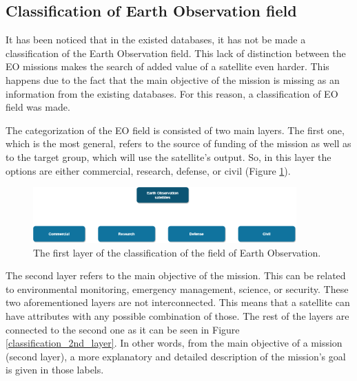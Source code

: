 \bigskip
\subsection{Classification of Earth Observation field}
\bigskip

It has been noticed that in the existed databases, it has not be made a classification of the Earth Observation field. This lack of distinction between the EO missions makes the search of added value of a satellite even harder. This happens due to the fact that the main objective of the mission is missing as an information from the existing databases. For this reason, a classification of EO field was made.

The categorization of the EO field is consisted of two main layers. The first one, which is the most general, refers to the source of funding of the mission as well as to the target group, which will use the satellite's output. So, in this layer the options are either commercial, research, defense, or civil (Figure \ref{classification_1st_layer}).

\begin{figure}
\centering
\includegraphics[width=0.9\textwidth]{Images/classification_1st_layer.png}\caption{The first layer of the classification of the field of Earth Observation.}
\label{classification_1st_layer}
\end{figure}

The second layer refers to the main objective of the mission. This can be related to environmental monitoring, emergency management, science, or security. These two aforementioned layers are not interconnected. This means that a satellite can have attributes with any possible combination of those. The rest of the layers are connected to the second one as it can be seen in Figure \ref{classification_2nd_layer}. In other words, from the main objective of a mission (second layer), a more explanatory and detailed description of the mission's goal is given in those labels.

